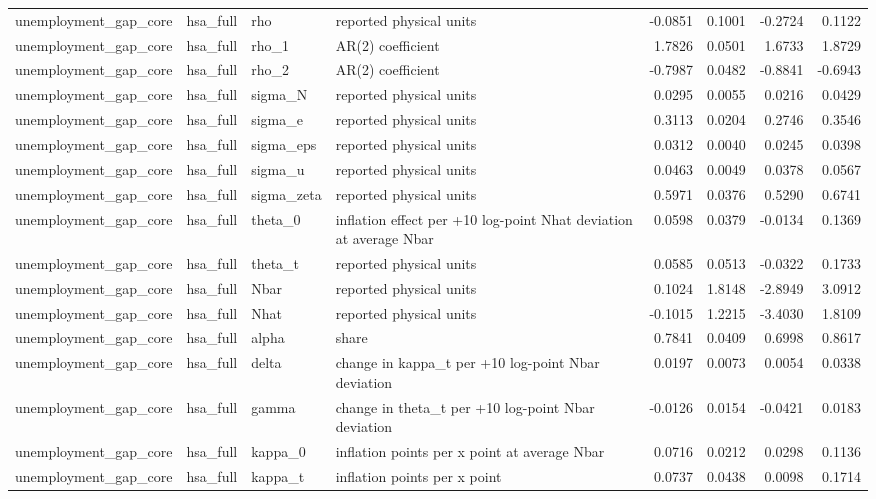 \begin{tabular}{llllrrrr}
unemployment\_gap\_core & hsa\_full & rho & reported physical units & -0.0851 & 0.1001 & -0.2724 & 0.1122 \\
unemployment\_gap\_core & hsa\_full & rho\_1 & AR(2) coefficient & 1.7826 & 0.0501 & 1.6733 & 1.8729 \\
unemployment\_gap\_core & hsa\_full & rho\_2 & AR(2) coefficient & -0.7987 & 0.0482 & -0.8841 & -0.6943 \\
unemployment\_gap\_core & hsa\_full & sigma\_N & reported physical units & 0.0295 & 0.0055 & 0.0216 & 0.0429 \\
unemployment\_gap\_core & hsa\_full & sigma\_e & reported physical units & 0.3113 & 0.0204 & 0.2746 & 0.3546 \\
unemployment\_gap\_core & hsa\_full & sigma\_eps & reported physical units & 0.0312 & 0.0040 & 0.0245 & 0.0398 \\
unemployment\_gap\_core & hsa\_full & sigma\_u & reported physical units & 0.0463 & 0.0049 & 0.0378 & 0.0567 \\
unemployment\_gap\_core & hsa\_full & sigma\_zeta & reported physical units & 0.5971 & 0.0376 & 0.5290 & 0.6741 \\
unemployment\_gap\_core & hsa\_full & theta\_0 & inflation effect per +10 log-point Nhat deviation at average Nbar & 0.0598 & 0.0379 & -0.0134 & 0.1369 \\
unemployment\_gap\_core & hsa\_full & theta\_t & reported physical units & 0.0585 & 0.0513 & -0.0322 & 0.1733 \\
unemployment\_gap\_core & hsa\_full & Nbar & reported physical units & 0.1024 & 1.8148 & -2.8949 & 3.0912 \\
unemployment\_gap\_core & hsa\_full & Nhat & reported physical units & -0.1015 & 1.2215 & -3.4030 & 1.8109 \\
unemployment\_gap\_core & hsa\_full & alpha & share & 0.7841 & 0.0409 & 0.6998 & 0.8617 \\
unemployment\_gap\_core & hsa\_full & delta & change in kappa\_t per +10 log-point Nbar deviation & 0.0197 & 0.0073 & 0.0054 & 0.0338 \\
unemployment\_gap\_core & hsa\_full & gamma & change in theta\_t per +10 log-point Nbar deviation & -0.0126 & 0.0154 & -0.0421 & 0.0183 \\
unemployment\_gap\_core & hsa\_full & kappa\_0 & inflation points per x point at average Nbar & 0.0716 & 0.0212 & 0.0298 & 0.1136 \\
unemployment\_gap\_core & hsa\_full & kappa\_t & inflation points per x point & 0.0737 & 0.0438 & 0.0098 & 0.1714 \\

\end{tabular}
